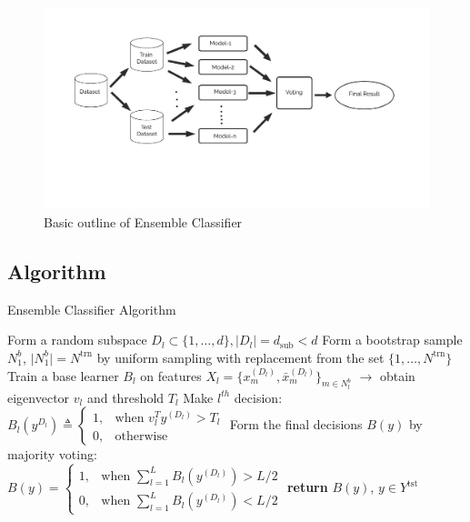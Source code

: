 \begin{figure}[H]
    \centering
    \includegraphics[width=160mm]{./img/ensemble.jpg}
    \caption{Basic outline of Ensemble Classifier}
\end{figure}
\clearpage
\subsection{Algorithm}
\begin{algorithm}
    \caption{Ensemble Classifier Algorithm \cite{5}}
    \begin{algorithmic}[1]
        \State Form a random subspace
        \State $D_l \subset \{1, \dots, d\}, \lvert D_l \rvert = d_{\text{sub}} < d$
        \State Form a bootstrap sample $N_1^b$, $\lvert N_1^b \rvert = N^{\text{trn}}$ by uniform sampling with \mbox{replacement} from the set $\{1, \dots, N^{\text{trn}}\}$
        \State Train a base learner $B_l$ on features
        \State $X_l = \{x_m^{(D_l)}, \bar{x}_m^{(D_l)}\}_{m \in N_l^b}$
        \State $\rightarrow$ obtain eigenvector $v_l$ and threshold $T_l$
    \EndFor
            \State Make $l^{th}$ decision: $B_l(y^{D_l}) \triangleq \begin{cases} 1, & \text{when } v_l^Ty^{(D_l)} > T_l \\ 0, & \text{otherwise} \end{cases}$
        \EndFor
    \EndFor
    \State Form the final decisions $B(y)$ by majority voting: \\
    $B(y) = \begin{cases} 1, & \text{when } \sum_{l=1}^{L} B_l(y^{(D_l)}) > L/2 \\ 0, & \text{when } \sum_{l=1}^{L} B_l(y^{(D_l)}) < L/2 \end{cases}$
    \State \textbf{return} $B(y)$, $y \in Y^{\text{tst}}$
    \end{algorithmic}
    \end{algorithm}
 
